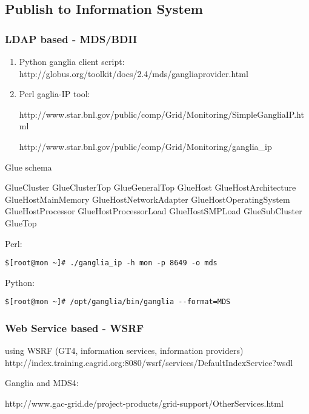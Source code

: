 \subsection{Publish to Information System}

\subsubsection{LDAP based - MDS/BDII}
\begin{enumerate}
  \item Python ganglia client script:
  http://globus.org/toolkit/docs/2.4/mds/gangliaprovider.html
  \item Perl gaglia-IP tool:
  
  http://www.star.bnl.gov/public/comp/Grid/Monitoring/SimpleGangliaIP.html
  
  http://www.star.bnl.gov/public/comp/Grid/Monitoring/ganglia\_ip

\end{enumerate}

Glue schema

GlueCluster
GlueClusterTop
GlueGeneralTop
GlueHost
GlueHostArchitecture
GlueHostMainMemory
GlueHostNetworkAdapter
GlueHostOperatingSystem
GlueHostProcessor
GlueHostProcessorLoad
GlueHostSMPLoad
GlueSubCluster
GlueTop

Perl:
\begin{lstlisting}
$[root@mon ~]# ./ganglia_ip -h mon -p 8649 -o mds
\end{lstlisting}

Python:
\begin{lstlisting}
$[root@mon ~]# /opt/ganglia/bin/ganglia --format=MDS
\end{lstlisting}


\subsubsection{Web Service based - WSRF}
using WSRF (GT4, information services, information providers)
http://index.training.cagrid.org:8080/wsrf/services/DefaultIndexService?wsdl

Ganglia and MDS4:
  
  http://www.gac-grid.de/project-products/grid-support/OtherServices.html
  
